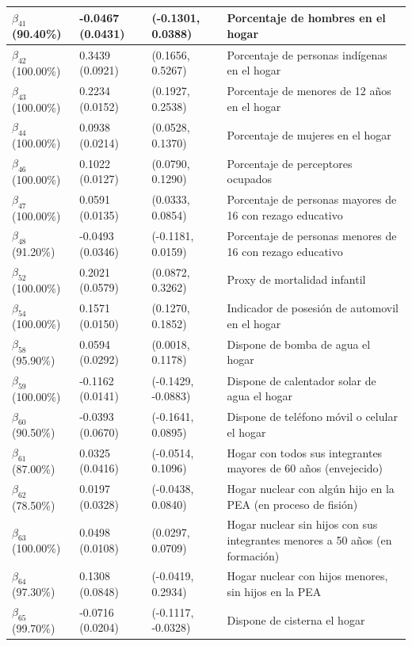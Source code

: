 \documentclass[11pt]{article}
\begin{document}
\begin{table}[H]
\begin{tabular}[t]{l|l|l|l}
\hline
$\beta_{41}$ (90.40\%) & -0.0467 (0.0431) & (-0.1301, 0.0388) & Porcentaje de hombres en el hogar\\
\hline
$\beta_{42}$ (100.00\%) & 0.3439 (0.0921) & (0.1656, 0.5267) & Porcentaje de personas indígenas en el hogar\\
\hline
$\beta_{43}$ (100.00\%) & 0.2234 (0.0152) & (0.1927, 0.2538) & Porcentaje de menores de 12 años en el hogar\\
\hline
$\beta_{44}$ (100.00\%) & 0.0938 (0.0214) & (0.0528, 0.1370) & Porcentaje de mujeres en el hogar\\
\hline
$\beta_{46}$ (100.00\%) & 0.1022 (0.0127) & (0.0790, 0.1290) & Porcentaje de perceptores ocupados\\
\hline
$\beta_{47}$ (100.00\%) & 0.0591 (0.0135) & (0.0333, 0.0854) & Porcentaje de personas mayores de 16 con rezago educativo\\
\hline
$\beta_{48}$ (91.20\%) & -0.0493 (0.0346) & (-0.1181, 0.0159) & Porcentaje de personas menores de 16 con rezago educativo\\
\hline
$\beta_{52}$ (100.00\%) & 0.2021 (0.0579) & (0.0872, 0.3262) & Proxy de mortalidad infantil\\
\hline
$\beta_{54}$ (100.00\%) & 0.1571 (0.0150) & (0.1270, 0.1852) & Indicador de posesión de automovil en el hogar\\
\hline
$\beta_{58}$ (95.90\%) & 0.0594 (0.0292) & (0.0018, 0.1178) & Dispone de bomba de agua el hogar\\
\hline
$\beta_{59}$ (100.00\%) & -0.1162 (0.0141) & (-0.1429, -0.0883) & Dispone de calentador solar de agua el hogar\\
\hline
$\beta_{60}$ (90.50\%) & -0.0393 (0.0670) & (-0.1641, 0.0895) & Dispone de teléfono móvil o celular el hogar\\
\hline
$\beta_{61}$ (87.00\%) & 0.0325 (0.0416) & (-0.0514, 0.1096) & Hogar con todos sus integrantes mayores de 60 años (envejecido)\\
\hline
$\beta_{62}$ (78.50\%) & 0.0197 (0.0328) & (-0.0438, 0.0840) & Hogar nuclear con algún hijo en la PEA (en proceso de fisión)\\
\hline
$\beta_{63}$ (100.00\%) & 0.0498 (0.0108) & (0.0297, 0.0709) & Hogar nuclear sin hijos con sus integrantes menores a 50 años (en formación)\\
\hline
$\beta_{64}$ (97.30\%) & 0.1308 (0.0848) & (-0.0419, 0.2934) & Hogar nuclear con hijos menores, sin hijos en la PEA\\
\hline
$\beta_{65}$ (99.70\%) & -0.0716 (0.0204) & (-0.1117, -0.0328) & Dispone de cisterna el hogar\\

\end{tabular}
\end{table}
\end{document}
